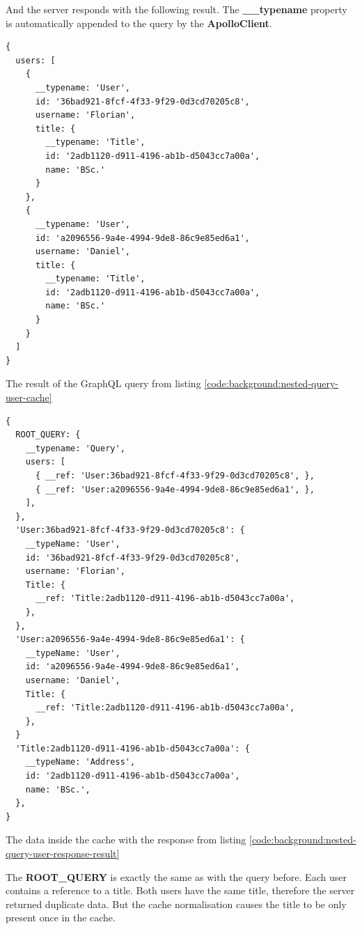 And the server responds with the following result. The \textbf{\_\_typename} property is automatically appended to the query by the \textbf{ApolloClient}.

\ifshowListings
\begin{listing}[H]
\begin{verbatim}
{
  users: [
    {
      __typename: 'User',
      id: '36bad921-8fcf-4f33-9f29-0d3cd70205c8',
      username: 'Florian',
      title: {
        __typename: 'Title',
        id: '2adb1120-d911-4196-ab1b-d5043cc7a00a',
        name: 'BSc.'
      }
    }, 
    {
      __typename: 'User',
      id: 'a2096556-9a4e-4994-9de8-86c9e85ed6a1',
      username: 'Daniel',
      title: {
        __typename: 'Title',
        id: '2adb1120-d911-4196-ab1b-d5043cc7a00a',
        name: 'BSc.'
      }
    }
  ]
}
\end{verbatim}
\caption{The result of the GraphQL query from listing \ref{code:background:nested-query-user-cache}}\label{code:background:nested-query-user-response-result}
\end{listing}
\fi

\ifshowListings
\begin{listing}[H]
\begin{verbatim}
{
  ROOT_QUERY: {
    __typename: 'Query',
    users: [
      { __ref: 'User:36bad921-8fcf-4f33-9f29-0d3cd70205c8', },
      { __ref: 'User:a2096556-9a4e-4994-9de8-86c9e85ed6a1', },
    ],
  },
  'User:36bad921-8fcf-4f33-9f29-0d3cd70205c8': {
    __typeName: 'User',
    id: '36bad921-8fcf-4f33-9f29-0d3cd70205c8',
    username: 'Florian',
    Title: {
      __ref: 'Title:2adb1120-d911-4196-ab1b-d5043cc7a00a',
    },
  },
  'User:a2096556-9a4e-4994-9de8-86c9e85ed6a1': {
    __typeName: 'User',
    id: 'a2096556-9a4e-4994-9de8-86c9e85ed6a1',
    username: 'Daniel',
    Title: {
      __ref: 'Title:2adb1120-d911-4196-ab1b-d5043cc7a00a',
    },
  }
  'Title:2adb1120-d911-4196-ab1b-d5043cc7a00a': {
    __typeName: 'Address',
    id: '2adb1120-d911-4196-ab1b-d5043cc7a00a',
    name: 'BSc.',
  },
}
\end{verbatim}
\caption{The data inside the cache with the response from listing \ref{code:background:nested-query-user-response-result}}\label{code:background:nested-query-user-cache-representation}
\end{listing}
\fi

The \textbf{ROOT\_QUERY} is exactly the same as with the query before. Each user contains a reference to a title. Both users have the same title, therefore the server returned duplicate data. But the cache normalisation causes the title to be only present once in the cache.


